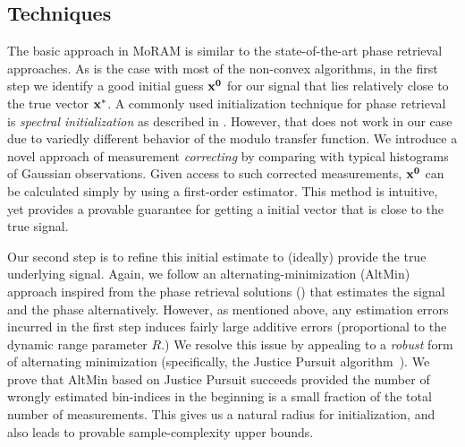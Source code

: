 \subsection{Techniques}

The basic approach in MoRAM is similar to the state-of-the-art phase retrieval approaches. As is the case with most of the non-convex algorithms, in the first step we identify a good initial guess $\mathbf{x^0}$ for our signal that lies relatively close to the true vector $\mathbf{x^*}$. A commonly used initialization technique for phase retrieval is \emph{spectral initialization} as described in \cite{Netrapalli2013}. However, that does not work in our case due to variedly different behavior of the modulo transfer function. %
We introduce a novel approach of measurement \emph{correcting} by comparing with typical histograms of Gaussian observations. Given access to such corrected measurements, $\mathbf{x^0}$ can be calculated simply by using a first-order estimator. This method is intuitive, yet provides %
	a provable guarantee for getting a initial vector that is close to the true signal. 

Our second step is to refine this initial estimate to (ideally) provide the true underlying signal. Again, we follow an alternating-minimization (AltMin) approach inspired from the phase retrieval solutions (\cite{Netrapalli2013}) that estimates the signal and the phase alternatively. However, as mentioned above, any estimation errors incurred in the first step induces fairly large additive errors (proportional to the dynamic range parameter $R$.) We resolve this issue by appealing to a \emph{robust} form of alternating minimization (specifically, the Justice Pursuit algorithm~). We prove that AltMin based on Justice Pursuit succeeds provided the number of wrongly estimated bin-indices in the beginning is a small fraction of the total number of measurements. This gives us a natural radius for initialization, and also leads to provable sample-complexity upper bounds.   %

